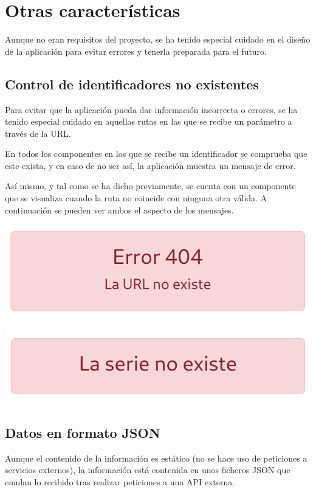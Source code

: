 \documentclass{\ClassPath/viu-tfm-template}
\begin{document}
\section{Otras características}
Aunque no eran requisitos del proyecto, se ha tenido especial cuidado en el diseño de la aplicación para evitar errores y tenerla preparada para el futuro.

\subsection{Control de identificadores no existentes}
Para evitar que la aplicación pueda dar información incorrecta o errores, se ha tenido especial cuidado en aquellas rutas en las que se recibe un parámetro a través de la URL.

En todos los componentes en los que se recibe un identificador se comprueba que este exista, y en caso de no ser así, la aplicación muestra un mensaje de error.

Así mismo, y tal como se ha dicho previamente, se cuenta con un componente que se visualiza cuando la ruta no coincide con ninguna otra válida. A continuación se pueden ver ambos el aspecto de los mensajes.

{
    \hfill
    \begin{minipage}{0.4\linewidth}
        \includegraphics[width=\linewidth]{img/error1.png}
    \end{minipage}
    \hfill
    \begin{minipage}{0.4\linewidth}
        \includegraphics[width=\linewidth]{img/error2.png}
    \end{minipage}
    \hfill
}


\subsection{Datos en formato JSON}
Aunque el contenido de la información es estático (no se hace uso de peticiones a servicios externos), la información está contenida en unos ficheros JSON que emulan lo recibido tras realizar peticiones a una API externa.
\end{document}
